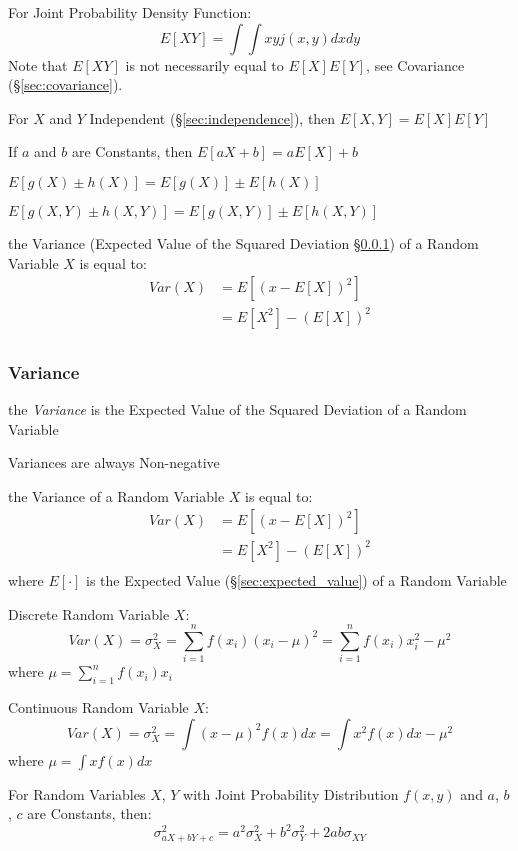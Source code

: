 For Joint Probability Density Function:
\[
  E[X Y] = \int\int x y j(x,y) dx dy
\]
\fist Note that $E[X Y]$ is not necessarily equal to $E[X]
E[Y]$, see Covariance (\S\ref{sec:covariance}).

For $X$ and $Y$ Independent (\S\ref{sec:independence}), then $E[X,Y] = E[X]
E[Y]$

If $a$ and $b$ are Constants, then $E[aX +b] = a E[X] + b$

$E [g(X) \pm h(X)] = E[g(X)] \pm E[h(X)]$

$E [g(X,Y) \pm h(X,Y)] = E[g(X,Y)] \pm E[h(X,Y)]$

the Variance (Expected Value of the Squared Deviation \S\ref{sec:variance}) of
a Random Variable $X$ is equal to:
\begin{align*}
  Var(X) & = E[(x - E[X])^2] \\
         & = E[X^2] - (E[X])^2 \\
\end{align*}



\subsubsection{Variance}\label{sec:variance}

the \emph{Variance} is the Expected Value of the Squared Deviation of a Random
Variable

Variances are always Non-negative

the Variance of a Random Variable $X$ is equal to:
\begin{align*}
  Var(X) & = E[(x - E[X])^2] \\
         & = E[X^2] - (E[X])^2 \\
\end{align*}
where $E[\cdot]$ is the Expected Value (\S\ref{sec:expected_value}) of a
Random Variable

Discrete Random Variable $X$:
\[
  Var(X) = \sigma_X^2 = \sum_{i=1}^n f(x_i) (x_i - \mu)^2 = \sum_{i=1}^n
  f(x_i) x_i^2 - \mu^2
\]
where $\mu = \sum_{i=1}^n f(x_i) x_i$

Continuous Random Variable $X$:
\[
  Var(X) = \sigma_X^2 = \int (x - \mu)^2 f(x) dx = \int x^2 f(x) dx -
  \mu^2
\]
where $\mu = \int x f(x) dx$

For Random Variables $X$, $Y$ with Joint Probability Distribution
$f(x,y)$ and $a$, $b$, $c$ are Constants, then:
\[
  \sigma^2_{a X + b Y + c} = a^2 \sigma^2_X + b^2 \sigma^2_Y + 2ab
  \sigma_{X Y}
\]




